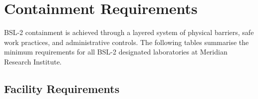 
\section{Containment Requirements}
\label{sec:containment}

BSL-2 containment is achieved through a layered system of physical barriers, safe
work practices, and administrative controls. The following tables summarise the
minimum requirements for all BSL-2 designated laboratories at Meridian Research
Institute.

\subsection{Facility Requirements}

